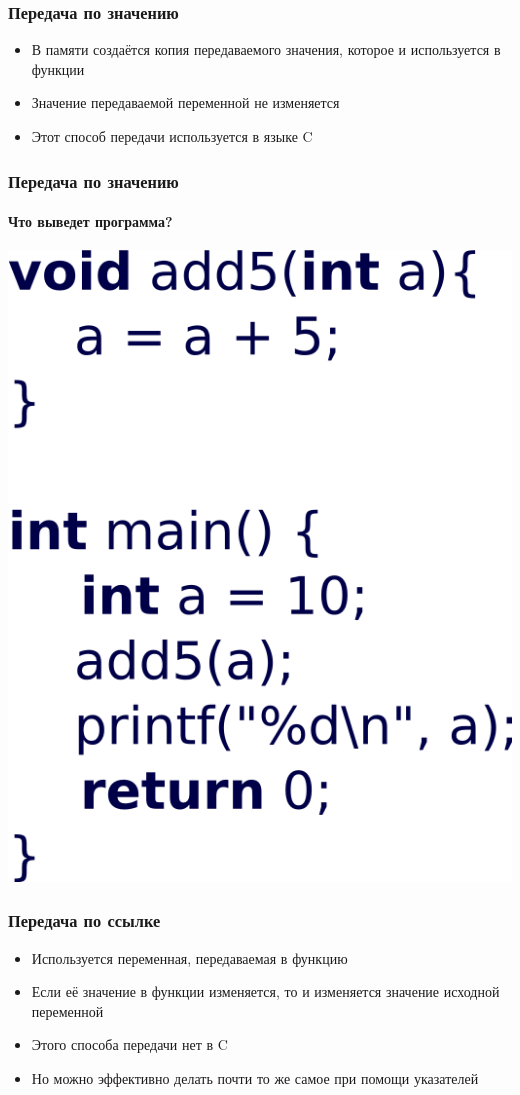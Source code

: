 \documentclass[12pt,pdf,hyperref={unicode}]{beamer}
\begin{document}
\begin{frame}[fragile]
\frametitle{Передача по значению} 
\begin{itemize}
\item В памяти создаётся копия передаваемого значения, которое и используется в функции
\item Значение передаваемой переменной не изменяется
\item Этот способ передачи используется в языке C
\end{itemize}
\end{frame}

\begin{frame}[fragile]
\frametitle{Передача по значению} 
\framesubtitle{Что выведет программа?} 
\begin{center}
\includegraphics[width=0.4\linewidth]{images/function_passvalue.png}
\end{center}
\end{frame}

\begin{frame}[fragile]
\frametitle{Передача по ссылке} 
\begin{itemize}
\item Используется переменная, передаваемая в функцию
\item Если её значение в функции изменяется, то и изменяется значение исходной переменной
\item Этого способа передачи нет в C
\item Но можно эффективно делать почти то же самое при помощи указателей
\end{itemize}
\end{frame}
\end{document}
